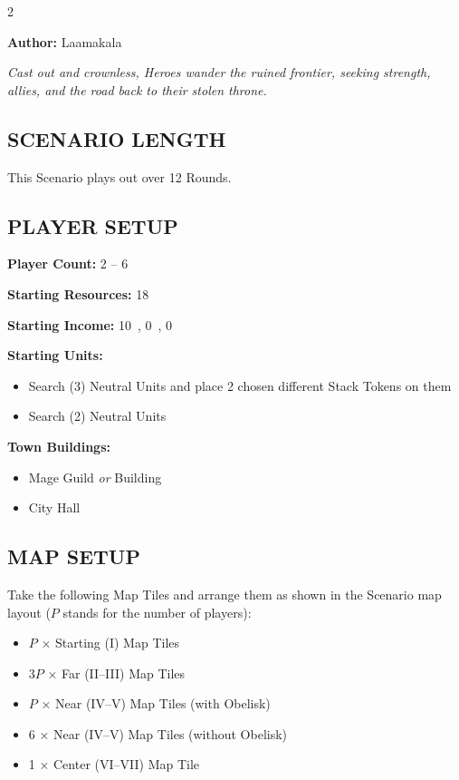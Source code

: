 
\begin{multicols}{2}

\textbf{Author:} Laamakala

\textit{Cast out and crownless, Heroes wander the ruined frontier, seeking strength, allies, and the road back to their stolen throne.}

\subsection*{\MakeUppercase{Scenario Length}}
This Scenario plays out over 12 Rounds.

\subsection*{\MakeUppercase{Player Setup}}
\textbf{Player Count:} 2 -- 6

\textbf{Starting Resources:} 18~

\textbf{Starting Income:} 10~, 0~, 0~

\textbf{Starting Units:}
\begin{itemize}
  \item Search (3) Neutral  Units and place 2 chosen different Stack Tokens on them
  \item Search (2) Neutral  Units
\end{itemize}

\textbf{Town Buildings:}
\begin{itemize}
  \item Mage Guild \textit{or}  Building
  \item City Hall
\end{itemize}

\subsection*{\MakeUppercase{Map Setup}}
Take the following Map Tiles and arrange them as shown in the Scenario map layout ($P$ stands for the number of players):

\begin{itemize}
  \item $P$ × Starting (I) Map Tiles
  \item 3$P$ × Far (II--III) Map Tiles
  \item $P$ × Near (IV--V) Map Tiles (with Obelisk)
  \item 6 × Near (IV--V) Map Tiles (without Obelisk)
  \item 1 × Center (VI--VII) Map Tile
\end{itemize}


\end{multicols}
